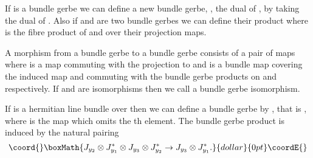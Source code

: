 \documentclass[a4paper,reqno]{amsart}
\theoremstyle{plain}
\theoremstyle{definition}
\theoremstyle{remark}
\numberwithin{equation}{section}
\numberwithin{figure}{section}
\providecommand{\<}{\langle}
\renewcommand{\>}{\rangle}
\begin{document}
If \coordHE{} is a bundle gerbe  we can define a
new bundle gerbe, \coordHE{}, the dual of \coordHE{}, by taking
the dual of \coordHE{}.
Also if  \coordHE{} and \coordHE{} are two bundle gerbes we can define their
product \coordHE{} where \coordHE{} is
the fibre product of \coordHE{} and \coordHE{} over their projection maps.

A morphism from a bundle gerbe  \coordHE{} to a bundle
gerbe  \coordHE{} consists of a pair of maps \coordHE{} where
           \coordHE{} is a map commuting with the
projection to \coordHE{} and  \coordHE{} is a bundle map covering the
induced map \coordHE{} and commuting with the
bundle gerbe products on \coordHE{} and \coordHE{} respectively. If \coordHE{} and \coordHE{} are
isomorphisms
then we call \coordHE{} a bundle gerbe isomorphism.

If \coordHE{} is a hermitian line bundle over \coordHE{} then we can define a
bundle gerbe \coordHE{} by \coordHE{}, that is \coordHE{},
where \coordHE{} is the map which omits the \coordHE{}th element.
The bundle gerbe product
is induced by the natural pairing
$$\coord{}\boxMath{
J_{y_2}\otimes J_{y_1}^*\otimes J_{y_3}\otimes J_{y_2}^* \to
J_{y_3}\otimes J_{y_1}^*.}{dollar}{0pt}\coordE{}$$
\end{document}
